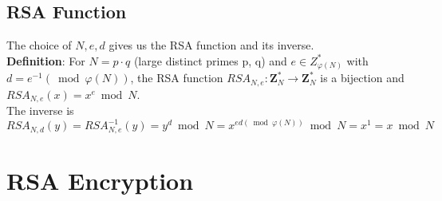 \documentclass{scribe}
\begin{document}
\subsection{RSA Function}
The choice of $N, e, d$ gives us the RSA function and its inverse.
\\
\textbf{Definition}: For $N=p \cdot q$ (large distinct primes p, q) and $e \in Z_{\varphi(N)}^*$ with $d = e^{-1} (\bmod \varphi(N))$, the RSA function $RSA _{N,e}: \mathbf{Z}_N^* \rightarrow \mathbf{Z}_N^*$ is a bijection and $RSA _{N,e}(x) = x^e \bmod N $.
\\
The inverse is $RSA _{N,d}(y) = RSA _{N,e}^{-1}(y) = y^d \bmod N  = x ^{ed (\bmod \varphi(N))} \bmod N = x ^1 = x \bmod N$

\section{RSA Encryption}

\lipsum



%

\end{document}
